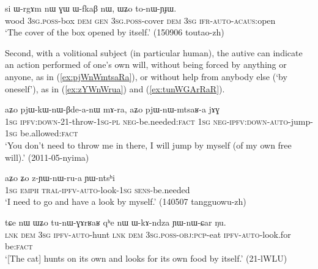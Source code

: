 \begin{exe}
\ex \label{ex:WZo.tonWYJW}
\gll si ɯ-rgɤm nɯ ɣɯ ɯ-fkaβ nɯ, ɯʑo to-nɯ-ɲɟɯ.  \\
wood \textsc{3sg}.\textsc{poss}-box \textsc{dem} \textsc{gen} \textsc{3sg}.\textsc{poss}-cover \textsc{dem} \textsc{3sg} \textsc{ifr}-\textsc{auto}-\textsc{acaus}:open \\
\glt `The cover of the box opened by itself.' (150906 toutao-zh)
\end{exe}

Second, with a volitional subject (in particular human), the autive can indicate an action performed of one's own will, without being forced by anything or anyone, as in (\ref{ex:pjWnWmtsaRa}), or without help from anybody else (`by oneself'), as in (\ref{ex:zYWnWrua}) and (\ref{ex:tunWGArRaR}).

\begin{exe}
\ex \label{ex:pjWnWmtsaRa}
\gll  aʑo pjɯ-kɯ-nɯ-βde-a-nɯ mɤ-ra, aʑo pjɯ-nɯ-mtsaʁ-a jɤɣ \\
\textsc{1sg} \textsc{ipfv}:\textsc{down}-2\fl{}1-throw-\textsc{1sg}-\textsc{pl} \textsc{neg}-be.needed:\textsc{fact} \textsc{1sg} \textsc{neg}-\textsc{ipfv}:\textsc{down}-\textsc{auto}-jump-\textsc{1sg} be.allowed:\textsc{fact} \\
\glt `You don't need to throw me in there, I will jump by myself (of my own free will).' (2011-05-nyima)
\end{exe}

\begin{exe}
\ex \label{ex:zYWnWrua}
\gll aʑo ʑo z-ɲɯ-nɯ-ru-a ɲɯ-ntsʰi \\
\textsc{1sg} \textsc{emph} \textsc{tral}-\textsc{ipfv}-\textsc{auto}-look-\textsc{1sg} \textsc{sens}-be.needed \\
\glt `I need to go and have a look by myself.' (140507 tangguowu-zh) 
\end{exe} 

\begin{exe}
	\ex \label{ex:tunWGArRaR}
	\gll tɕe nɯ ɯʑo tu-nɯ-ɣɤrʁaʁ qʰe nɯ ɯ-kɤ-ndza ɲɯ-nɯ-ɕar ŋu. \\
	\textsc{lnk} \textsc{dem} \textsc{3sg} \textsc{ipfv}-\textsc{auto}-hunt \textsc{lnk} \textsc{dem} \textsc{3sg}.\textsc{poss}-\textsc{obj}:\textsc{pcp}-eat \textsc{ipfv}-\textsc{auto}-look.for be:\textsc{fact} \\
	\glt `[The cat] hunts on its own and looks for its own food by itself.' (21-lWLU)
\end{exe} 


